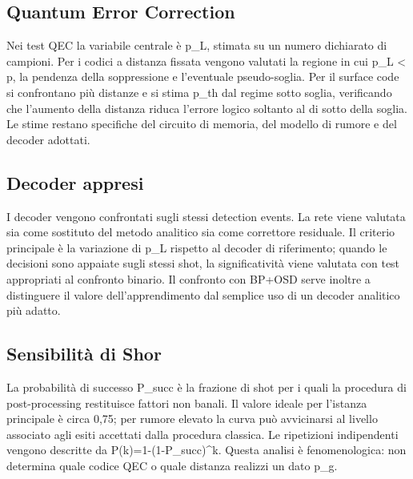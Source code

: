 \subsection{Quantum Error Correction}\label{sec:finale_2_6_2}\label{subsec:metriche_qec}

Nei test QEC la variabile centrale è p\_L, stimata su un numero dichiarato di campioni. Per i codici a distanza fissata vengono valutati la regione in cui p\_L \textless{} p, la pendenza della soppressione e l'eventuale pseudo-soglia. Per il surface code si confrontano più distanze e si stima p\_th dal regime sotto soglia, verificando che l'aumento della distanza riduca l'errore logico soltanto al di sotto della soglia. Le stime restano specifiche del circuito di memoria, del modello di rumore e del decoder adottati. \cite{fowler2012,googleQECBelowThreshold2025,googleSurfaceCode2023,aharonov1997fault,dennis2002topological,calderbankShor1996,gottesman1997}

\subsection{Decoder appresi}\label{sec:finale_2_6_3}

I decoder vengono confrontati sugli stessi detection events. La rete viene valutata sia come sostituto del metodo analitico sia come correttore residuale. Il criterio principale è la variazione di p\_L rispetto al decoder di riferimento; quando le decisioni sono appaiate sugli stessi shot, la significatività viene valutata con test appropriati al confronto binario. Il confronto con BP+OSD serve inoltre a distinguere il valore dell'apprendimento dal semplice uso di un decoder analitico più adatto. \cite{alphaqubit2024,torlaiMelko2017,roffe2020,panteleev2021}

\subsection{Sensibilità di Shor}\label{sec:finale_2_6_4}

La probabilità di successo P\_succ è la frazione di shot per i quali la procedura di post-processing restituisce fattori non banali. Il valore ideale per l'istanza principale è circa 0,75; per rumore elevato la curva può avvicinarsi al livello associato agli esiti accettati dalla procedura classica. Le ripetizioni indipendenti vengono descritte da P(k)=1-(1-P\_succ)\^{}k. Questa analisi è fenomenologica: non determina quale codice QEC o quale distanza realizzi un dato p\_g.

